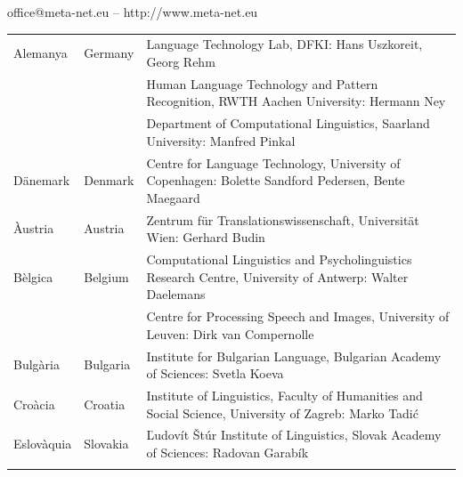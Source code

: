 \vfill
\centerline{office@meta-net.eu -- http://www.meta-net.eu}

\cleardoublepage

\appendix
{}

%

  
\cleardoublepage

\label{metanetmembers}

\small

\begin{longtable}{@{}llp{113mm}@{}}
  Alemanya & \textcolor{grey1}{Germany} & Language Technology Lab, DFKI: Hans Uszkoreit, Georg Rehm\\ \addlinespace
  & & Human Language Technology and Pattern Recognition, RWTH Aachen University: Hermann Ney \\ \addlinespace
  & & Department of Computational Linguistics, Saarland University: Manfred Pinkal\\ \addlinespace Dänemark &  \textcolor{grey1}{Denmark} & Centre for Language Technology, University of Copenhagen: \newline Bolette Sandford Pedersen, Bente Maegaard\\ \addlinespace
  Àustria & \textcolor{grey1}{Austria} & Zentrum für Translationswissenschaft, Universität Wien: Gerhard Budin\\ \addlinespace 
  Bèlgica & \textcolor{grey1}{Belgium} & Computational Linguistics and Psycholinguistics Research Centre, University of Antwerp: Walter Daelemans\\ \addlinespace
  & & Centre for Processing Speech and Images, University of Leuven: Dirk van Compernolle \\ \addlinespace
  Bulgària & \textcolor{grey1}{Bulgaria} & Institute for Bulgarian Language, Bulgarian Academy of Sciences: Svetla Koeva \\ \addlinespace
  Croàcia & \textcolor{grey1}{Croatia} & Institute of Linguistics, Faculty of Humanities and Social Science, University of Zagreb: Marko Tadić \\ \addlinespace
  Eslovàquia & \textcolor{grey1}{Slovakia} & Ľudovít Štúr Institute of Linguistics, Slovak Academy of Sciences: Radovan Garabík \\ \addlinespace 

\end{longtable}

